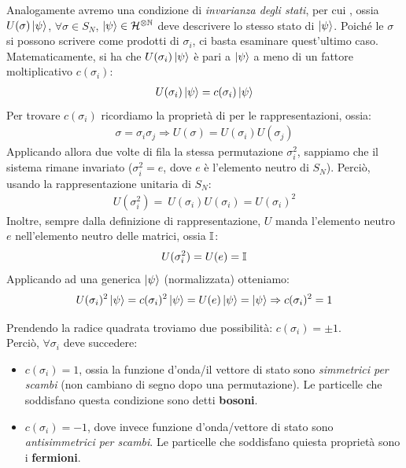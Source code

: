 \documentclass[../../FisicaTeorica.tex]{subfiles}
\begin{document}
Analogamente avremo una condizione di \textit{invarianza degli stati}, per cui , ossia $U(\sigma)\Ket{\psi}$, $\forall \sigma \in S_N$, $\Ket{\psi} \in \mathcal{H}^{\otimes \mathbb{N}}$ deve descrivere lo stesso stato di $\Ket{\psi}$. Poiché le $\sigma$ si possono scrivere come prodotti di $\sigma_i$, ci basta esaminare quest'ultimo caso.\\
Matematicamente, si ha che $U(\sigma_i)\Ket{\psi}$ è pari a $\Ket{\psi}$ a meno di un fattore moltiplicativo $c(\sigma_i)$:
\begin{align*}
U(\sigma_i)\Ket{\psi} = c(\sigma_i)\Ket{\psi}
\end{align*}
Per trovare $c(\sigma_i)$ ricordiamo la proprietà di  per le rappresentazioni, ossia:
\begin{align*}
\sigma = \sigma_i \sigma_j \Rightarrow U(\sigma) = U(\sigma_i)U(\sigma_j)
\end{align*}
Applicando allora due volte di fila la stessa permutazione $\sigma_i^2$, sappiamo che il sistema rimane invariato ($\sigma_i^2 = e$, dove $e$ è l'elemento neutro di $S_N$). Perciò, usando la rappresentazione unitaria di $S_N$:
\begin{align*}
U(\sigma_i^2) =\ U(\sigma_i)U(\sigma_i)=U(\sigma_i)^2
\end{align*}
Inoltre, sempre dalla definizione di rappresentazione, $U$ manda l'elemento neutro $e$ nell'elemento neutro delle matrici, ossia $\mathbb{I}$:
\begin{align*}
U(\sigma_i^2) = U(e) = \mathbb{I}
\end{align*}
Applicando ad una generica $\Ket{\psi}$ (normalizzata) otteniamo:
\begin{align*}
U(\sigma_i)^2 \Ket{\psi} = c(\sigma_i)^2 \Ket{\psi} = U(e)\Ket{\psi} =\Ket{\psi} \Rightarrow c(\sigma_i)^2 =1
\end{align*}

Prendendo la radice quadrata troviamo due possibilità: $c(\sigma_i)=\pm 1$.\\
Perciò, $\forall \sigma_i$ deve succedere:
\begin{itemize}
\item $c(\sigma_i) = 1$, ossia la funzione d'onda/il vettore di stato sono \textit{simmetrici per scambi} (non cambiano di segno dopo una permutazione). Le particelle che soddisfano questa condizione sono detti \textbf{bosoni}.
\item $c(\sigma_i)=-1$, dove invece funzione d'onda/vettore di stato sono \textit{antisimmetrici per scambi}. Le particelle che soddisfano quiesta proprietà sono i \textbf{fermioni}.
\end{itemize}
\end{document}
